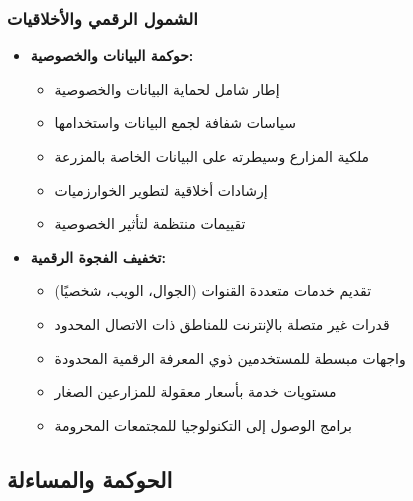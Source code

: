 \subsubsection{الشمول الرقمي والأخلاقيات}
\begin{itemize}
    \item \textbf{حوكمة البيانات والخصوصية:}
    \begin{itemize}
        \item إطار شامل لحماية البيانات والخصوصية
        \item سياسات شفافة لجمع البيانات واستخدامها
        \item ملكية المزارع وسيطرته على البيانات الخاصة بالمزرعة
        \item إرشادات أخلاقية لتطوير الخوارزميات
        \item تقييمات منتظمة لتأثير الخصوصية
    \end{itemize}
    
    \item \textbf{تخفيف الفجوة الرقمية:}
    \begin{itemize}
        \item تقديم خدمات متعددة القنوات (الجوال، الويب، شخصيًا)
        \item قدرات غير متصلة بالإنترنت للمناطق ذات الاتصال المحدود
        \item واجهات مبسطة للمستخدمين ذوي المعرفة الرقمية المحدودة
        \item مستويات خدمة بأسعار معقولة للمزارعين الصغار
        \item برامج الوصول إلى التكنولوجيا للمجتمعات المحرومة
    \end{itemize}
\end{itemize}

\subsection{الحوكمة والمساءلة}

